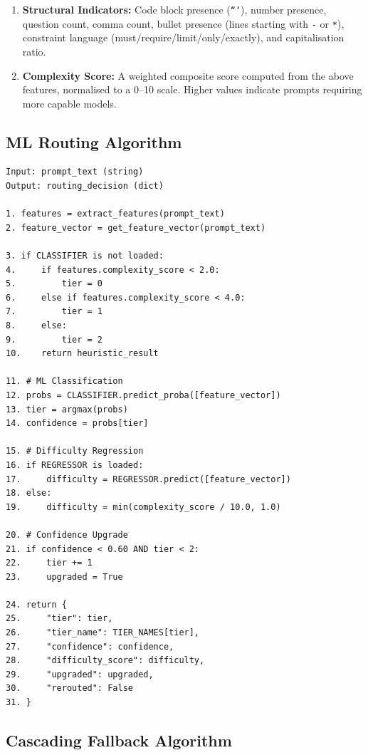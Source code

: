 \documentclass[12pt,a4paper]{report}
\begin{document}
\begin{enumerate}[nosep]
\begin{itemize}[nosep]
        \item \texttt{is\_simple\_qa}: matches \texttt{\textbackslash b(what is|who is|when did|where is|capital of|...)\textbackslash b}
    \end{itemize}
    \item \textbf{Structural Indicators:} Code block presence (\texttt{```}), number presence, question count, comma count, bullet presence (lines starting with \texttt{-} or \texttt{*}), constraint language (must/require/limit/only/exactly), and capitalisation ratio.
    \item \textbf{Complexity Score:} A weighted composite score computed from the above features, normalised to a 0--10 scale. Higher values indicate prompts requiring more capable models.
\end{enumerate}

\subsection{ML Routing Algorithm}

\begin{lstlisting}[caption={XGBoost Routing Algorithm}, label={lst:routing}]
Input: prompt_text (string)
Output: routing_decision (dict)

1. features = extract_features(prompt_text)
2. feature_vector = get_feature_vector(prompt_text)

3. if CLASSIFIER is not loaded:
4.     if features.complexity_score < 2.0:
5.         tier = 0
6.     else if features.complexity_score < 4.0:
7.         tier = 1
8.     else:
9.         tier = 2
10.    return heuristic_result

11. # ML Classification
12. probs = CLASSIFIER.predict_proba([feature_vector])
13. tier = argmax(probs)
14. confidence = probs[tier]

15. # Difficulty Regression
16. if REGRESSOR is loaded:
17.     difficulty = REGRESSOR.predict([feature_vector])
18. else:
19.     difficulty = min(complexity_score / 10.0, 1.0)

20. # Confidence Upgrade
21. if confidence < 0.60 AND tier < 2:
22.     tier += 1
23.     upgraded = True

24. return {
25.     "tier": tier,
26.     "tier_name": TIER_NAMES[tier],
27.     "confidence": confidence,
28.     "difficulty_score": difficulty,
29.     "upgraded": upgraded,
30.     "rerouted": False
31. }
\end{lstlisting}

\subsection{Cascading Fallback Algorithm}
\end{document}
